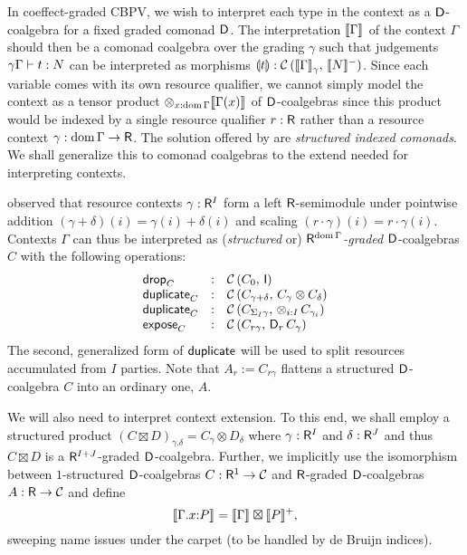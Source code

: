 \documentclass[acmsmall,review,anonymous]{acmart}\settopmatter{printfolios=true,printccs=false,printacmref=false}
\theoremstyle{remark}
\begin{document}
In coeffect-graded CBPV, we wish to interpret each type in the context
as a $\D$-coalgebra for a fixed graded comonad $\D$.  The
interpretation $\den \Gamma$ of the context $\Gamma$ should then be a
comonad coalgebra over the grading $\gamma$ such that judgements
$\qCompTy \gamma \Gamma t N$ can be interpreted as morphisms
$\dent t : \Hom {\Den\Gamma \gamma} {\denn N}$.  Since each variable
comes with its own resource qualifier, we cannot simply model the
context as a tensor product $\tupt {x:\dom\Gamma} \den{\Gamma(x)}$ of
$\D$-coalgebras since this product would be indexed by a single resource
qualifier $r : \R$ rather than a resource context
$\gamma : \dom\Gamma \to \R$.  The solution offered by
\citet{orchard:icfp14} are \emph{structured indexed comonads}.  We
shall generalize this to comonad coalgebras to the extend needed for
interpreting contexts.

\citet{mcBride:wadler60} observed that resource contexts
$\gamma : \R^I$ form a left $\R$-semimodule under pointwise addition
$(\gamma + \delta)(i) = \gamma(i) + \delta(i)$ and scaling
$(r \cdot \gamma)(i) = r \cdot \gamma(i)$.  Contexts $\Gamma$ can thus
be interpreted as
(\emph{structured} or)
\emph{$\R^{\dom \Gamma}$-graded}
$\D$-coalgebras $C$ with
the following operations:
\[
\begin{array}{lcl}
  \tdrop[C]     & : & \Hom {C_0} {\I} \\
  \duplicate[C] & : & \Hom {C_{\gamma+\delta}} {C_\gamma \otimes C_\delta} \\
  \duplicate[C] & : & \Hom {C_{\sumt I \gamma}} {\tupt {i:I} C_{\gamma_i}} \\
  \expose[C]    & : & \Hom {C_{r\gamma}} {\D[r]\,C_\gamma} \\
\end{array}
\]
The second, generalized form of $\tduplicate$ will be used to split
resources accumulated from $I$ parties.  Note that
$A_r := C_{r\gamma}$ flattens a structured $\D$-coalgebra $C$ into an
ordinary one, $A$.

We will also need to interpret context extension.  To this end, we
shall employ a structured product
$(C \boxtimes D)_{\gamma.\delta} = C_\gamma \otimes D_\delta$ where
$\gamma : \R^I$ and $\delta : \R^J$ and thus $C \boxtimes D$ is a
$\R^{I+J}$-graded $\D$-coalgebra.  Further, we implicitly use the
isomorphism between $1$-structured $\D$-coalgebras $C : \R^1 \to \CC$
and $\R$-graded $\D$-coalgebras $A : \R \to \CC$ and define
\[
\den{\ext \Gamma x P}
  = \den \Gamma \boxtimes \denp P
  ,
\]
sweeping name issues under the carpet (to be handled by de Bruijn indices).
\end{document}
